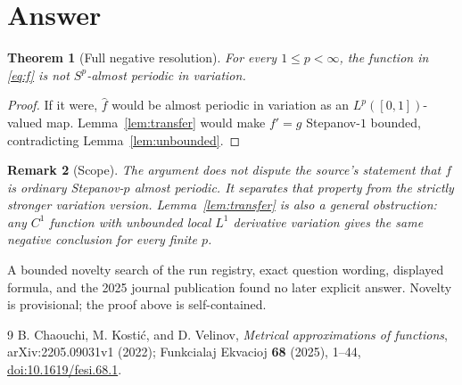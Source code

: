 \documentclass[11pt]{article}
\newtheorem{theorem}{Theorem}
\newtheorem{remark}[theorem]{Remark}
\begin{document}
\section{Answer}

\begin{theorem}[Full negative resolution]\label{thm:answer}
For every $1\leq p<\infty$, the function in \eqref{eq:f} is not
$S^p$-almost periodic in variation.
\end{theorem}

\begin{proof}
If it were, $\widehat f$ would be almost periodic in variation as an
$L^p([0,1])$-valued map.  Lemma~\ref{lem:transfer} would make $f'=g$
Stepanov-$1$ bounded, contradicting Lemma~\ref{lem:unbounded}.
\end{proof}

\begin{remark}[Scope]
The argument does not dispute the source's statement that $f$ is ordinary
Stepanov-$p$ almost periodic.  It separates that property from the strictly
stronger variation version.  Lemma~\ref{lem:transfer} is also a general
obstruction: any $C^1$ function with unbounded local $L^1$ derivative
variation gives the same negative conclusion for every finite $p$.
\end{remark}

A bounded novelty search of the run registry, exact question wording,
displayed formula, and the 2025 journal publication found no later explicit
answer.  Novelty is provisional; the proof above is self-contained.

\begin{thebibliography}{9}
B. Chaouchi, M. Kosti\'c, and D. Velinov,
\emph{Metrical approximations of functions}, arXiv:2205.09031v1 (2022);
Funkcialaj Ekvacioj \textbf{68} (2025), 1--44,
\href{https://doi.org/10.1619/fesi.68.1}{doi:10.1619/fesi.68.1}.
\end{thebibliography}
\end{document}
